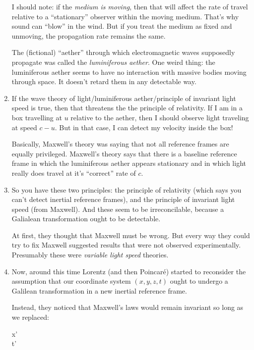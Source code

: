\begin{enumerate}
  I should note: if the \emph{medium is moving}, then that will affect
  the rate of travel relative to a ``stationary'' observer within the
  moving medium. That's why sound can ``blow'' in the wind. But if you
  treat the medium as fixed and unmoving, the propagation rate remains
  the same.

  The (fictional) ``aether'' through which electromagnetic waves
  supposedly propagate was called the \emph{luminiferous aether}. One
  weird thing: the luminiferous aether seems to have no interaction with
  massive bodies moving through space. It doesn't retard them in any
  detectable way.

  \item If the wave theory of light/luminiferous aether/principle of
  invariant light speed is true, then that threatens the the principle
  of relativity. If I am in a box travelling at $u$ relative to the
  aether, then I should observe light traveling at speed $c - u$. But in
  that case, I can detect my velocity inside the box!

  Basically, Maxwell's theory was saying that not all reference frames
  are equally privileged. Maxwell's theory says that there is a baseline
  reference frame in which the luminiferous aether appears stationary
  and in which light really does travel at it's ``correct'' rate of $c$.

  \item So you have these two principles: the principle of relativity
  (which says you can't detect inertial reference frames), and the
  principle of invariant light speed (from Maxwell). And these seem to
  be irreconcilable, because a Galialean transformation ought to be
  detectable.

  At first, they thought that Maxwell must be wrong. But every way they
  could try to fix Maxwell suggested results that were not observed
  experimentally. Presumably these were \emph{variable light speed}
  theories.

  \item Now, around this time Lorentz (and then Poincaré) started to
  reconsider the assumption that our coordinate system $(x, y, z, t)$
  ought to undergo a Galilean transformation in a new inertial reference
  frame.

  Instead, they noticed that Maxwell's laws would remain invariant so
  long as we replaced:

  \begin{nedqn}
    x'
  \eqcol
  \\
    t'
  \eqcol
  \end{nedqn}


\end{enumerate}
